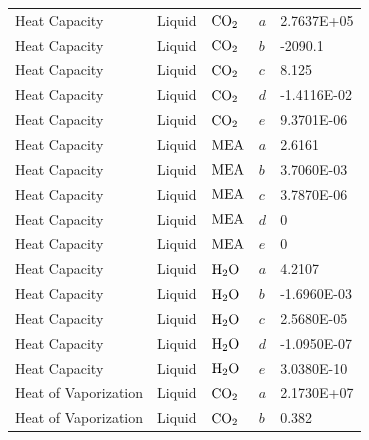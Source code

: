 \documentclass[a4paper,fleqn]{cas-sc}
\begin{document}
\begin{longtable}{lllll}
        Heat Capacity             & Liquid         & $\ce{CO2}$          & $a$               & 2.7637E+05     \\
        Heat Capacity             & Liquid         & $\ce{CO2}$          & $b$               & -2090.1        \\
        Heat Capacity             & Liquid         & $\ce{CO2}$          & $c$               & 8.125          \\
        Heat Capacity             & Liquid         & $\ce{CO2}$          & $d$               & -1.4116E-02    \\
        Heat Capacity             & Liquid         & $\ce{CO2}$          & $e$               & 9.3701E-06     \\
        Heat Capacity             & Liquid         & $\ce{MEA}$          & $a$               & 2.6161         \\
        Heat Capacity             & Liquid         & $\ce{MEA}$          & $b$               & 3.7060E-03     \\
        Heat Capacity             & Liquid         & $\ce{MEA}$          & $c$               & 3.7870E-06     \\
        Heat Capacity             & Liquid         & $\ce{MEA}$          & $d$               & 0              \\
        Heat Capacity             & Liquid         & $\ce{MEA}$          & $e$               & 0              \\
        Heat Capacity             & Liquid         & $\ce{H2O}$          & $a$               & 4.2107         \\
        Heat Capacity             & Liquid         & $\ce{H2O}$          & $b$               & -1.6960E-03    \\
        Heat Capacity             & Liquid         & $\ce{H2O}$          & $c$               & 2.5680E-05     \\
        Heat Capacity             & Liquid         & $\ce{H2O}$          & $d$               & -1.0950E-07    \\
        Heat Capacity             & Liquid         & $\ce{H2O}$          & $e$               & 3.0380E-10     \\
        Heat of Vaporization      & Liquid         & $\ce{CO2}$          & $a$               & 2.1730E+07     \\
        Heat of Vaporization      & Liquid         & $\ce{CO2}$          & $b$               & 0.382          \\

\end{longtable}
\end{document}
